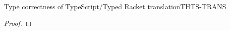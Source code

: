 \documentclass[acmlarge, anonymous, authordraft, review]{acmart} %
\begin{document}
\begin{lemma}{Type correctness of TypeScript/Typed Racket translation}{THTS-TRANS}
\begin{proof}
%       
%     
%       
%       
% 
%   
  \end{proof}
\end{lemma}
\end{document}
